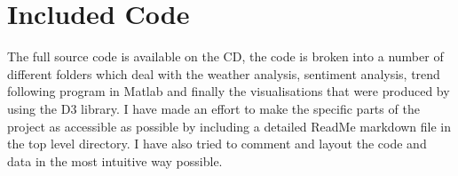 
\chapter{Included Code} %

\label{AppendixA} %

The full source code is available on the CD, the code is broken into a number of different folders which deal with the weather analysis, sentiment analysis, trend following program in Matlab and finally the visualisations that were produced by using the D3 library. I have made an effort to make the specific parts of the project as accessible as possible by including a detailed ReadMe markdown file in the top level directory. I have also tried to comment and layout the code and data in the most intuitive way possible. 
